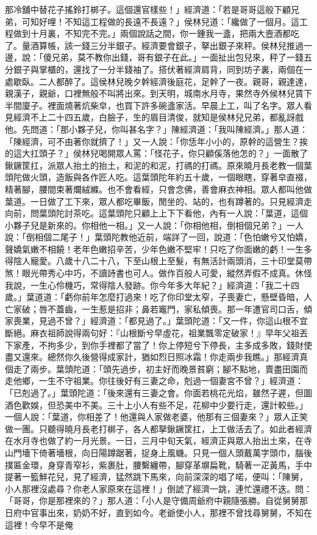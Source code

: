 那冷舖中替花子搖鈴打梆子。這個還官樣些！」經濟道：「若是哥哥這般下顧兄弟，可知好哩！不知這工程做的長遠不長遠？」侯林兒道：「纔做了一個月。這工程做到十月裏，不知完不完。」兩個說話之間，你一鍾我一盞，把兩大壼酒都吃了。量酒算帳，該一錢三分半銀子。經濟要會銀子，拏出銀子來秤。侯林兒推過一邊，說：「傻兄弟，莫不教你出錢，哥有銀子在此。」一面扯出包兒來，秤了一錢五分銀子與掌櫃的，還找了一分半錢袖了。搭伏著經濟肩背，同到坊子裏，兩個在一處歇臥。二人都醉了。這侯林兒晚夕幹經濟後庭花，足幹了一夜。親哥，親達達，親漢子，親爺，口裡無般不叫將出來。到天明，城南水月寺，果然寺外侯林兒賃下半間廈子。裡面燒著炕柴皁，也買下許多碗盞家活。早晨上工，叫了名字。眾人看見經濟不上二十四五歲，白臉子，生的眉目清俊，就知是侯林兒兄弟，都亂訝戲他。先問道：「那小夥子兒，你叫甚名字？」陳經濟道：「我叫陳經濟。」那人道：「陳經濟，可不由著你就擠了！」又一人說：「你恁年小小的，原幹的這營生？挨的這大扛頭子？」侯林兒喝開眾人罵：「怪花子，你只顧傒落他怎的？」一面散了鍬鐝筐扛，派眾人抬土的抬土，和泥的和泥，打禡的打禡。原來曉月長老教一個葉頭陀做火頭，造飯與各作匠人吃。這葉頭陀年約五十歲，一個眼瞎，穿著皁直裰，精著腳，腰間束著爛絨縧。也不會看經，只會念佛，善會麻衣神相。眾人都叫他做葉道。一日做了工下來，眾人都吃畢飯，閒坐的、站的，也有蹲著的。只見經濟走向前，問葉頭陀討茶吃。這葉頭陀只顧上上下下看他，內有一人說：「葉道，這個小夥子兒是新來的。你相他一相。」又一人說：「你相他相，倒相個兄弟？」一人說：「倒相個二尾子！」葉頭陀教他近前，端詳了一回，說道：「色怕嫩兮又怕嬌，聲嬌氣嫩不相饒！老年色嫩招辛苦，少年色嫩不堅牢！只吃了你面嫩的虧！一生多得陰人寵愛。八歲十八二十八，下至山根上至髮，有無活計兩頭消，三十印堂莫帶煞！眼光帶秀心中巧，不讀詩書也可人。做作百般人可愛，縱然弄假不成真。休怪我說，一生心伶機巧，常得陰人發跡。你今年多大年紀？」經濟道：「我二十四歲。」葉道道：「虧你前年怎麼打過來！吃了你印堂太窄，子喪妻亡，懸壁昏暗，人亡家破；唇不蓋齒，一生惹是招非；鼻若竈門，家私傾喪。那一年遭官司口舌，傾家喪業，見過不曾？」經濟道：「都見過了。」葉頭陀道：「又一件，你這山根不宜斷絕。麻衣祖師說得兩句好：『山根斷兮早虛花，祖業飄零定破家！』早年父祖丟下家產，不拘多少，到你手裡都了當了！你上停短兮下停長，主多成多敗，錢財使盡又還來。總然你久後營得成家計，猶如烈日照冰霜！你走兩步我瞧。」那經濟真個走了兩步。葉頭陀道：「頭先過步，初主好而晚景貧窮；腳不點地，賣盡田園而走他鄉，一生不守祖業。你往後好有三妻之命，剋過一個妻宮不曾？」經濟道：「已剋過了。」葉頭陀道：「後來還有三妻之會。你面若桃花光焰，雖然子遲，但圖酒色歡娛，但恐美中不美。三十上小人有些不足，花柳中少要行走，還計較些。」一個人說：「葉道，你相差了！他還與人家做老婆，他那有三個妻來？」眾人正笑做一團。只聽得曉月長老打梆子，各人都拏鍬鐝筐扛，上工做活去了。如此者經濟在水月寺也做了約一月光景。一日，三月中旬天氣，經濟正與眾人抬出土來，在寺山門墻下倚著墻根，向日陽蹲踞著，捉身上風蟣。只見一個人頭戴萬字頭巾，腦後撲匾金環，身穿青窄衫，紫裹肚，腰繫纏帶，腳穿革塀扁靴，騎著一疋黃馬，手中提著一籃鮮花兒，見了經濟，猛然跳下馬來，向前深深的唱了喏，便叫：「陳舅，小人那裡沒處尋？你老人家原來在這裡！」倒諕了經濟一跳，連忙還禮不迭。問：「哥哥，你是那裡來的？」那人道：「小人是守備周爺府中親隨張勝。自從舅舅那日府中官事出來，奶奶不好，直到如今。老爺使小人，那裡不曾找尋舅舅，不知在這裡！今早不是俺